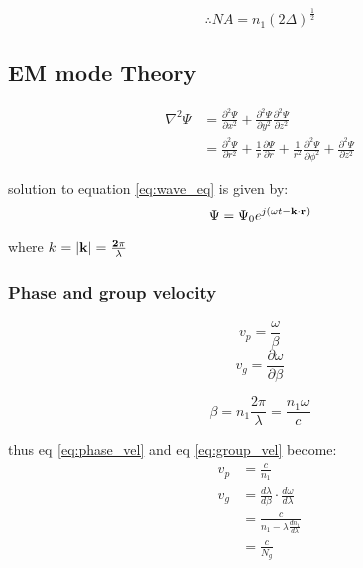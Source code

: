 \documentclass[12pt, onecolumn]{article}
\begin{document}
        \begin{equation}
           \therefore NA = n_1 (2\Delta)^\frac{1}{2}
        \end{equation}

    \subsection{EM mode Theory}
        \begin{equation}
            \begin{aligned}
                \nabla^2 \Psi &= \frac{\partial^2 \Psi}{\partial x^2} + \frac{\partial^2 \Psi}{\partial y^2} \frac{\partial^2 \Psi}{\partial z^2} \\
                    &= \frac{\partial^2 \Psi}{\partial r^2} + \frac{1}{r} \frac{\partial \Psi}{\partial r} + \frac{1}{r^2} \frac{\partial^2 \Psi}{\partial \phi^2} + \frac{\partial^2 \Psi}{\partial z^2}
            \end{aligned}
            \label{eq:wave_eq}
        \end{equation}
    
        solution to equation \ref{eq:wave_eq} is given by:
        \begin{equation}
            \Psi = \Psi_0 e^{j(\omega t - \bf{k} \cdot \bf{r})}
            \label{eq:wave}
        \end{equation}

        where $k = |\bf{k}| = \frac{2\pi}{\lambda}$ 

        \subsubsection{Phase and group velocity}
            \begin{equation}
                v_p = \frac{\omega}{\beta}
                \label{eq:phase_vel}
            \end{equation}
            \begin{equation}
                v_g = \frac{\partial\omega}{\partial\beta}
                \label{eq:group_vel}
            \end{equation} 
        
            \begin{equation}
                \beta = n_1 \frac{2\pi}{\lambda} = \frac{n_1\omega}{c}
            \end{equation}

            thus eq \ref{eq:phase_vel} and eq \ref{eq:group_vel} become:
            \begin{equation}
                \boxed{\begin{aligned}
                        v_p &= \frac{c}{n_1} \\
                        v_g &= \frac{d\lambda}{d\beta} \cdot \frac{d\omega}{d\lambda} \\
                            &= \frac{c}{n_1 - \lambda  \displaystyle\frac{d n_1}{d\lambda}} \\
                            &= \frac{c}{N_g}
                \end{aligned}}
            \end{equation}
\end{document}
